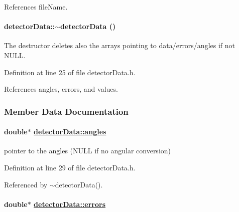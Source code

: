 References file\-Name.\hypertarget{classdetectorData_d32a037cc2bd6e8caf4556cbd4b88ec7}{
\paragraph[$\sim$detectorData]{\setlength{\rightskip}{0pt plus 5cm}detector\-Data::$\sim$detector\-Data ()}\hfill}
\label{classdetectorData_d32a037cc2bd6e8caf4556cbd4b88ec7}


The destructor deletes also the arrays pointing to data/errors/angles if not NULL. 



Definition at line 25 of file detector\-Data.h.

References angles, errors, and values.

\subsubsection{Member Data Documentation}
\hypertarget{classdetectorData_cc9f9708b9ff2d840208cae843fb4b7a}{
\paragraph[angles]{\setlength{\rightskip}{0pt plus 5cm}double$\ast$ \hyperlink{classdetectorData_cc9f9708b9ff2d840208cae843fb4b7a}{detector\-Data::angles}}\hfill}
\label{classdetectorData_cc9f9708b9ff2d840208cae843fb4b7a}


pointer to the angles (NULL if no angular conversion) 



Definition at line 29 of file detector\-Data.h.

Referenced by $\sim$detector\-Data().\hypertarget{classdetectorData_29cb1c6bb5635e918ae28505ccd0d8f9}{
\paragraph[errors]{\setlength{\rightskip}{0pt plus 5cm}double$\ast$ \hyperlink{classdetectorData_29cb1c6bb5635e918ae28505ccd0d8f9}{detector\-Data::errors}}\hfill}
\label{classdetectorData_29cb1c6bb5635e918ae28505ccd0d8f9}


